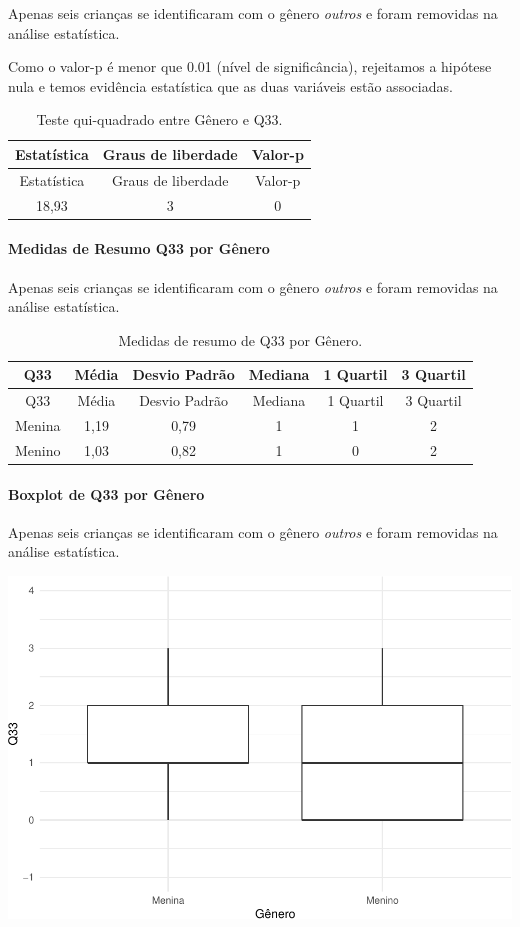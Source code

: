\documentclass[]{article}
\let\oldparagraph\paragraph
\renewcommand{\paragraph}[1]{\oldparagraph{#1}\mbox{}}
\begin{document}
Apenas seis crianças se identificaram com o gênero \emph{outros} e foram removidas na análise estatística.

Como o valor-p é menor que 0.01 (nível de significância), rejeitamos a hipótese nula e temos evidência estatística que as duas variáveis estão associadas.

\begin{longtable}[]{@{}ccc@{}}
\caption{\label{tab:unnamed-chunk-1147}Teste qui-quadrado entre Gênero e Q33.}\tabularnewline
\toprule
Estatística & Graus de liberdade & Valor-p\tabularnewline
\midrule
\endfirsthead
\toprule
Estatística & Graus de liberdade & Valor-p\tabularnewline
\midrule
\endhead
18,93 & 3 & 0\tabularnewline
\bottomrule
\end{longtable}

\cleardoublepage

\hypertarget{medidas-de-resumo-q33-por-guxeanero}{%
\paragraph{Medidas de Resumo Q33 por Gênero}\label{medidas-de-resumo-q33-por-guxeanero}}

Apenas seis crianças se identificaram com o gênero \emph{outros} e foram removidas na análise estatística.

\begin{longtable}[]{@{}cccccc@{}}
\caption{\label{tab:unnamed-chunk-1148}Medidas de resumo de Q33 por Gênero.}\tabularnewline
\toprule
Q33 & Média & Desvio Padrão & Mediana & 1 Quartil & 3 Quartil\tabularnewline
\midrule
\endfirsthead
\toprule
Q33 & Média & Desvio Padrão & Mediana & 1 Quartil & 3 Quartil\tabularnewline
\midrule
\endhead
Menina & 1,19 & 0,79 & 1 & 1 & 2\tabularnewline
Menino & 1,03 & 0,82 & 1 & 0 & 2\tabularnewline
\bottomrule
\end{longtable}

\hypertarget{boxplot-de-q33-por-guxeanero}{%
\paragraph{Boxplot de Q33 por Gênero}\label{boxplot-de-q33-por-guxeanero}}

Apenas seis crianças se identificaram com o gênero \emph{outros} e foram removidas na análise estatística.

\begin{center}\includegraphics[width=0.75\linewidth]{relatorio_covid19_files/figure-latex/unnamed-chunk-1149-1} \end{center}
\end{document}
